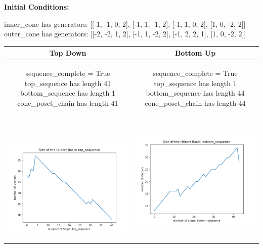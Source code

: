 \documentclass[10pt]{article}
\begin{document}
\textbf{Initial Conditions:}
\begin{SAGE}
inner_cone has generators: 
[[-1, -1, 0, 2], [-1, 1, -1, 2], [-1, 1, 0, 2], [1, 0, -2, 2]]
outer_cone has generators: 
[[-2, -2, 1, 2], [-1, 1, -2, 2], [-1, 2, 2, 1], [1, 0, -2, 2]]

\end{SAGE}
\begin{tabular}{c|c}
\textbf{Top Down} & \textbf{Bottom Up} \\ \hline  
\begin{SAGE}
	sequence_complete = True
	top_sequence has length 41
	bottom_sequence has length 1
	cone_poset_chain has length 41
\end{SAGE} 
&
\begin{SAGE}
	sequence_complete = True
	top_sequence has length 1
	bottom_sequence has length 44
	cone_poset_chain has length 44
\end{SAGE} 
\\ \hline
\
\begin{minipage}{.45\textwidth}
\includegraphics[width=\textwidth]{"DATA/4d/4 generators 2 bound G/top_sequence SIZE"}
\end{minipage} &
\begin{minipage}{.45\textwidth}
\includegraphics[width=\textwidth]{"DATA/4d/4 generators 2 bound G bottomup/bottom_sequence SIZE"}

\end{minipage}
\end{tabular}
\end{document}
